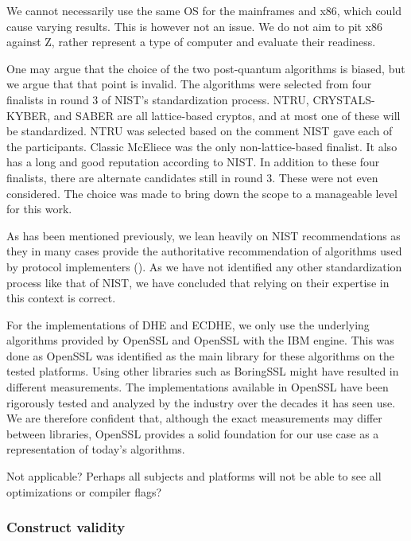 We cannot necessarily use the same OS for the mainframes and x86, which could cause varying results. This is however not an issue. We do not aim to pit x86 against Z, rather represent a type of computer and evaluate their readiness.

One may argue that the choice of the two post-quantum algorithms is biased, but we argue that that point is invalid. The algorithms were selected from four finalists in round 3 of NIST's standardization process. NTRU, CRYSTALS-KYBER, and SABER are all lattice-based cryptos, and at most one of these will be standardized. NTRU was selected based on the comment NIST gave each of the participants. Classic McEliece was the only non-lattice-based finalist. It also has a long and good reputation according to NIST. In addition to these four finalists, there are alternate candidates still in round 3. These were not even considered. The choice was made to bring down the scope to a manageable level for this work.

As has been mentioned previously, we lean heavily on NIST recommendations as they in many cases provide the authoritative recommendation of algorithms used by protocol implementers (). As we have not identified any other standardization process like that of NIST, we have concluded that relying on their expertise in this context is correct.

For the implementations of DHE and ECDHE, we only use the underlying algorithms provided by OpenSSL and OpenSSL with the IBM engine. This was done as OpenSSL was identified as the main library for these algorithms on the tested platforms. Using other libraries such as BoringSSL might have resulted in different measurements. The implementations available in OpenSSL have been rigorously tested and analyzed by the industry over the decades it has seen use. We are therefore confident that, although the exact measurements may differ between libraries, OpenSSL provides a solid foundation for our use case as a representation of today's algorithms.


Not applicable?
Perhaps all subjects and platforms will not be able to see all optimizations or compiler flags?

\subsubsection{Construct validity}


